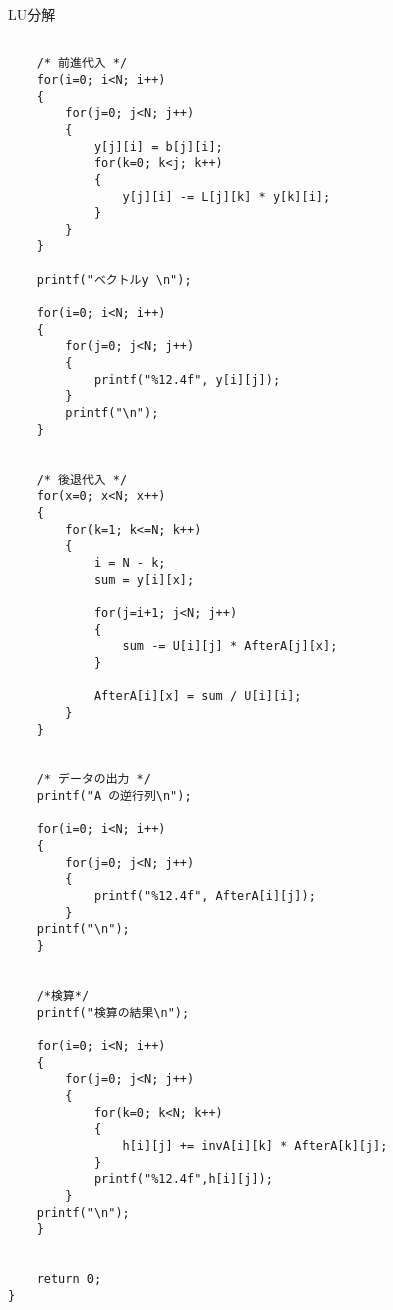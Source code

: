 \documentclass[a4j,titlepage]{jarticle}
\begin{document}
\begin{breakitembox}[l]{LU分解}
\begin{verbatim}
    
    /* 前進代入 */
    for(i=0; i<N; i++)
    {
        for(j=0; j<N; j++)
        {
            y[j][i] = b[j][i];
            for(k=0; k<j; k++)
            {
                y[j][i] -= L[j][k] * y[k][i];
            }
        }
    }
    
    printf("ベクトルy \n");
    
    for(i=0; i<N; i++)
    {
        for(j=0; j<N; j++)
        {
            printf("%12.4f", y[i][j]);
        }
        printf("\n");
    }
    
    
    /* 後退代入 */
    for(x=0; x<N; x++)
    {
        for(k=1; k<=N; k++)
        {
            i = N - k;
            sum = y[i][x];
            
            for(j=i+1; j<N; j++)
            {
                sum -= U[i][j] * AfterA[j][x];
            }
            
            AfterA[i][x] = sum / U[i][i];
        }
    }
    
    
    /* データの出力 */
    printf("A の逆行列\n");
    
    for(i=0; i<N; i++)
    {
        for(j=0; j<N; j++)
        {
            printf("%12.4f", AfterA[i][j]);
        }
    printf("\n");
    }


    /*検算*/
    printf("検算の結果\n");
    
    for(i=0; i<N; i++)
    {
        for(j=0; j<N; j++)
        {
            for(k=0; k<N; k++)
            {
                h[i][j] += invA[i][k] * AfterA[k][j];
            }
           	printf("%12.4f",h[i][j]);
        }
    printf("\n");
    }
    
    
    return 0;
}
\end{verbatim}
\end{breakitembox}
\end{document}
